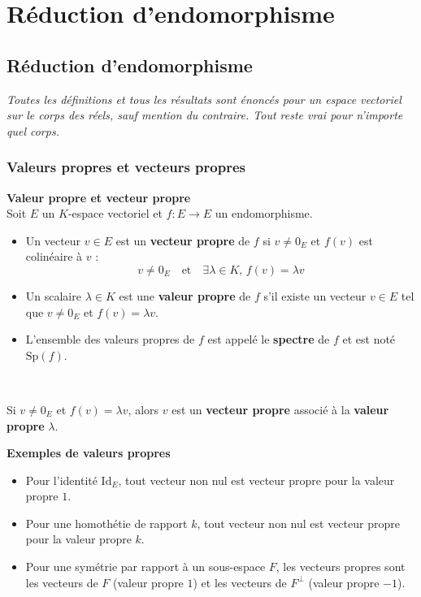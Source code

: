 \documentclass[../PolyS4.tex]{subfiles}
\begin{document}
\setcounter{chapter}{7}
\chapter{Réduction d'endomorphisme}
\section{Réduction d'endomorphisme}

\textit{Toutes les définitions et tous les résultats sont énoncés pour un espace vectoriel sur le corps des réels, sauf mention du contraire. Tout reste vrai pour n'importe quel corps.}

\subsection{Valeurs propres et vecteurs propres}

\begin{Def}\textbf{Valeur propre et vecteur propre}\\

Soit $E$ un $K$-espace vectoriel et $f : E \to E$ un endomorphisme.
\begin{itemize}
    \item Un vecteur $v \in E$ est un \textbf{vecteur propre} de $f$ si $v \neq 0_E$ et $f(v)$ est colinéaire à $v$ :
    $$v \neq 0_E \quad \text{et} \quad \exists \lambda \in K, \, f(v) = \lambda v$$
    \item Un scalaire $\lambda \in K$ est une \textbf{valeur propre} de $f$ s'il existe un vecteur $v \in E$ tel que $v \neq 0_E$ et $f(v) = \lambda v$.
    \item L'ensemble des valeurs propres de $f$ est appelé le \textbf{spectre} de $f$ et est noté $\mathrm{Sp}(f)$.
\end{itemize}
\end{Def}

\begin{Rmq}$\,$

Si $v \neq 0_E$ et $f(v) = \lambda v$, alors $v$ est un \textbf{vecteur propre} associé à la \textbf{valeur propre} $\lambda$.
\end{Rmq}

\begin{Ex}\textbf{Exemples de valeurs propres}\\

\begin{itemize}
    \item Pour l'identité $\mathrm{Id}_E$, tout vecteur non nul est vecteur propre pour la valeur propre $1$.
    \item Pour une homothétie de rapport $k$, tout vecteur non nul est vecteur propre pour la valeur propre $k$.
    \item Pour une symétrie par rapport à un sous-espace $F$, les vecteurs propres sont les vecteurs de $F$ (valeur propre $1$) et les vecteurs de $F^\perp$ (valeur propre $-1$).
\end{itemize}
\end{Ex}
\end{document}
